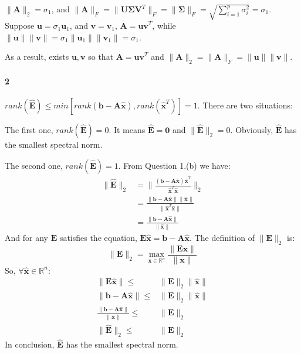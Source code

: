 \documentclass[22pt]{article}
\begin{document}
	$\|\mathbf{A}\|_2 = \sigma_1$, and  $\|\mathbf{A}\|_F = \|\mathbf{U \Sigma V}^T\|_F = \|\mathbf{\Sigma}\|_F = \sqrt{\sum\limits_{i=1}^{p}\sigma_i^2} = \sigma_1 $. Suppose $\mathbf{u} = \sigma_1 \mathbf{u}_1$, and $\mathbf{v} = \mathbf{v}_1$, $\mathbf{A =uv}^T$, while $\|\mathbf{u}\|\|\mathbf{v}\| = \sigma_1\|\mathbf{u}_1\|\|\mathbf{v}_1\|  = \sigma_1$.

	As a result, exists $\mathbf{u,v}$ so that $\mathbf{A =uv}^T$ and $\|\mathbf{A}\|_2 = \|\mathbf{A}\|_F =\|\mathbf{u}\|\|\mathbf{v}\| $.

	\paragraph{2} $rank(\hat{\mathbf{E}}) \leq min[rank(\mathbf{b-A\hat{x}}),rank(\hat{\mathbf{x}}^T)] = 1$. There are two situations:

	The first one, $rank(\hat{\mathbf{E}}) = 0$. It means $\hat{\mathbf{E}} = \mathbf{0}$ and $\|\hat{\mathbf{E}}\|_2 = 0$. Obviously, $\hat{\mathbf{E}}$ has the smallest spectral norm.

	The second one, $rank(\hat{\mathbf{E}}) = 1$. From Question 1.(b) we have:
	\begin{align}
		\|\hat{\mathbf{E}}\|_2 & = \|\frac{(\mathbf{b-A\hat{x}})\mathbf{\hat{x}}^T}{\mathbf{\hat{x}}^T\hat{\mathbf{x}}}\|_2\\
		& = \frac{\|\mathbf{b-A\hat{x}}\|\|\mathbf{\hat{x}}\|}{\|\mathbf{\hat{x}}^T\hat{\mathbf{x}}\|}\\
		& = \frac{\|\mathbf{b-A\hat{x}}\|}{\|\hat{\mathbf{x}}\|}
	\end{align}
	And for any $\mathbf{E}$ satisfies the equation, $\mathbf{E\hat{x}} = \mathbf{b-A\hat{x}} $. The definition of $\|\mathbf{E}\|_2$ is:
	\begin{equation}
		\|\mathbf{E}\|_2 = \max_{\mathbf{x}\in \mathbb{R}^n}\frac{\|\mathbf{Ex}\|}{\|\mathbf{x}\|}
	\end{equation}
	So, $\forall \mathbf{\hat{x}}\in  \mathbb{R}^n$:
	\begin{align}
		\|\mathbf{E\hat{x}}\| \leq & \|\mathbf{E}\|_2\|\mathbf{\hat{x}}\|\\
		\|\mathbf{b-A\hat{x}}\| \leq & \|\mathbf{E}\|_2\|\mathbf{\hat{x}}\|\\
		\frac{\|\mathbf{b-A\hat{x}}\|}{\|\hat{\mathbf{x}}\|}  \leq & \|\mathbf{E}\|_2\\
		\|\mathbf{\hat{E}}\|_2 \leq	& \|\mathbf{E}\|_2
	\end{align}
	In conclusion, $\mathbf{\hat{E}}$ has the smallest spectral norm.
\end{document}
